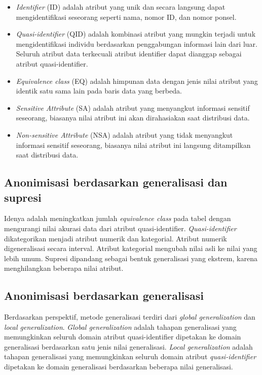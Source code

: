 \begin{itemize}
\item \textit{Identifier} (ID) adalah atribut yang unik dan secara langsung dapat mengidentifikasi seseorang seperti nama, nomor ID, dan nomor ponsel.
\item \textit{Quasi-identifier} (QID) adalah kombinasi atribut yang mungkin terjadi untuk mengidentifikasi individu berdasarkan penggabungan informasi lain dari luar. Seluruh atribut data terkecuali atribut identifier dapat dianggap sebagai atribut quasi-identifier.
\item \textit{Equivalence class} (EQ) adalah himpunan data 
dengan jenis nilai atribut yang identik satu sama lain pada baris data yang berbeda.
\item \textit{Sensitive Attribute} (SA) adalah atribut yang menyangkut informasi  sensitif seseorang, biasanya nilai atribut ini akan dirahasiakan saat distribusi data.
\item \textit{Non-sensitive Attribute} (NSA) adalah atribut yang tidak menyangkut informasi sensitif seseorang, biasanya nilai atribut ini langsung ditampilkan saat distribusi data.
\end{itemize}

\newpage
\subsection{Anonimisasi berdasarkan generalisasi dan supresi}
Idenya adalah meningkatkan jumlah \textit{equivalence class} pada tabel dengan mengurangi nilai akurasi data dari atribut quasi-identifier. \textit{Quasi-identifier} dikategorikan menjadi atribut numerik dan kategorial. Atribut numerik digeneralisasi secara interval. Atribut kategorial mengubah nilai asli ke nilai yang lebih umum. Supresi dipandang sebagai bentuk generalisasi yang ekstrem, karena menghilangkan beberapa nilai atribut.

\subsection{Anonimisasi berdasarkan generalisasi} 
Berdasarkan perspektif, metode generalisasi terdiri dari \textit{global generalization} dan \textit{local generalization}. \textit{Global generalization} adalah tahapan generalisasi yang memungkinkan seluruh domain atribut quasi-identifier dipetakan ke domain generalisasi berdasarkan satu jenis nilai generalisasi. \textit{Local generalization} adalah tahapan generalisasi yang memungkinkan seluruh domain atribut \textit{quasi-identifier} dipetakan ke domain generalisasi berdasarkan beberapa nilai generalisasi.

